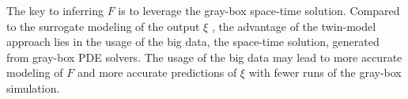 %


The key to inferring $F$ is to leverage the gray-box space-time solution.
Compared to the surrogate modeling of the output $\xi$ \cite{surrogate review}, the advantage of
the twin-model approach lies in the usage of the big data, the space-time solution, generated from
gray-box PDE solvers. The usage of the big data may lead to more accurate modeling of $F$ and more
accurate predictions of $\xi$ with fewer runs of the gray-box simulation.\\

